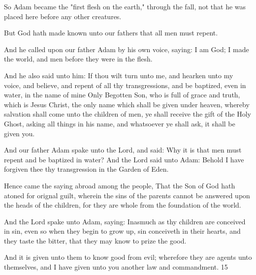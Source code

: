 So Adam became the "first flesh on the earth," through the fall, not that he was placed here
before any other creatures.

But God hath made known unto our fathers that all men must repent.

And he called upon our father Adam by his own voice, saying: I am God; I made the world,
and men before they were in the flesh.

And he also said unto him: If thou wilt turn unto me, and hearken unto my voice, and
believe, and repent of all thy transgressions, and be baptized, even in water, in the name of
mine Only Begotten Son, who is full of grace and truth, which is Jesus Christ, the only name
which shall be given under heaven, whereby salvation shall come unto the children of men,
ye shall receive the gift of the Holy Ghost, asking all things in his name, and whatsoever ye
shall ask, it shall be given you.

And our father Adam spake unto the Lord, and said: Why it is that men must repent and be
baptized in water? And the Lord said unto Adam: Behold I have forgiven thee thy
transgression in the Garden of Eden.

Hence came the saying abroad among the people, That the Son of God hath atoned for
orignal guilt, wherein the sins of the parents cannot be answered upon the heads of the
children, for they are whole from the foundation of the world.

And the Lord spake unto Adam, saying: Inasmuch as thy children are conceived in sin, even
so when they begin to grow up, sin conceiveth in their hearts, and they taste the bitter, that
they may know to prize the good.

And it is given unto them to know good from evil; wherefore they are agents unto
themselves, and I have given unto you another law and commandment. 15

